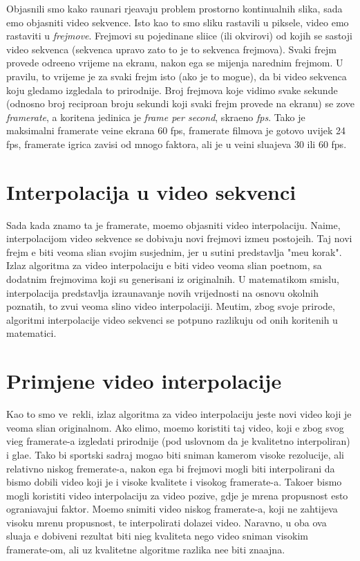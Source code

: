 Objasnili smo kako ra\ch unari rje\sh avaju problem prostorno kontinualnih slika, sada \cj emo objasniti video sekvence. Isto kao \sh to smo sliku rastavili u piksele, video \cj emo rastaviti u \textit{frejmove}. Frejmovi su pojedina\ch ne sli\ch ice (ili okvirovi)
od kojih se sastoji video sekvenca (sekvenca upravo zato \sh to je to sekvenca frejmova). Svaki frejm provede odre\dj eno vrijeme na ekranu, nakon \ch ega se mijenja narednim frejmom. U pravilu, to vrijeme je za svaki frejm isto (ako je to mogu\cj e), da
bi video sekvenca koju gledamo izgledala \sh to prirodnije. Broj frejmova koje vidimo svake sekunde (odnosno broj recipro\ch an broju sekundi koji svaki frejm provede na ekranu) se zove \textit{framerate}, a kori\sh tena jedinica je \textit{frame per second}, 
skra\cj eno \textit{fps}. Tako je maksimalni framerate ve\cj ine ekrana 60 fps, framerate filmova je gotovo uvijek 24 fps, framerate igrica zavisi od mnogo faktora, ali je u ve\cj ini slu\ch ajeva 30 ili 60 fps.

\section{Interpolacija u video sekvenci}
Sada kada znamo \sh ta je framerate, mo\zh emo objasniti video interpolaciju. Naime, interpolacijom video sekvence se dobivaju novi frejmovi izme\dj u postoje\cj ih. Taj novi frejm \cj e biti veoma sli\ch an svojim susjednim, jer u su\sh tini predstavlja
"me\dj u korak". Izlaz algoritma za video interpolaciju \cj e biti video veoma sli\ch an po\ch etnom, sa dodatnim frejmovima koji su generisani iz originalnih. U matemati\ch kom smislu, interpolacija predstavlja izra\ch unavanje novih vrijednosti na osnovu
okolnih poznatih, \sh to zvu\ch i veoma sli\ch no video interpolaciji. Me\dj utim, zbog svoje prirode, algoritmi interpolacije video sekvenci se potpuno razlikuju od onih kori\sh tenih u matematici\cite{mcfiwiki}.

\section{Primjene video interpolacije}
Kao \sh to smo ve\cj\ rekli, izlaz algoritma za video interpolaciju jeste novi video koji je veoma sli\ch an originalnom. Ako \zh elimo, mo\zh emo koristiti taj video, koji \cj e zbog svog vi\sh eg framerate-a izgledati prirodnije (pod uslovnom da je kvalitetno
interpoliran) i gla\dj e. Tako bi sportski sadr\zh aj mogao biti sniman kamerom visoke rezolucije, ali relativno niskog fremerate-a, nakon \ch ega bi frejmovi mogli biti interpolirani da bismo dobili video koji je i visoke kvalitete i visokog framerate-a.
Tako\dj er bismo mogli koristiti video interpolaciju za video pozive, gdje je mre\zh na propusnost \ch esto ograni\ch avaju\cj i faktor. Mo\zh emo snimiti video niskog framerate-a, koji ne zahtijeva visoku mre\zh nu propusnost, te interpolirati
dolaze\cj i video. Naravno, u oba ova slu\ch aja \cj e dobiveni rezultat biti ni\zh eg kvaliteta nego video sniman visokim framerate-om, ali uz kvalitetne algoritme razlika ne\cj e biti zna\ch ajna.

